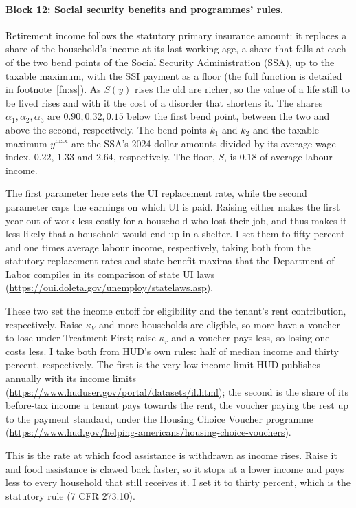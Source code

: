 \documentclass[10pt]{article}
\begin{document}
\paragraph{Block 12: Social security benefits and programmes' rules.}
\begin{description}\setlength{\itemsep}{0.25em}\setlength{\parskip}{0em}
\item[$S(y)$ and $\underline S$, social security and its floor.] Retirement income follows the statutory
primary insurance amount: it replaces a share of the household's income at its last working
age, a share that falls at each of the two bend points of the Social Security Administration (SSA), up to
the taxable maximum, with the SSI payment as a floor (the full function is detailed in footnote~\ref{fn:ss}). As $S(y)$ rises the old are richer, so the value of a life
still to be lived rises and with it the cost of a disorder that shortens it. The shares
$\alpha_1,\alpha_2,\alpha_3$ are $0.90, 0.32, 0.15$ below the first bend point, between the two and above the second, respectively. The
bend points $k_1$ and $k_2$ and the taxable maximum $y^{\max}$ are the SSA's 2024 dollar
amounts divided by its average wage index, $0.22$, $1.33$ and
$2.64$, respectively. The floor, $\underline S$, is $0.18$ of average
labour income.
\item[$\psi_{ui}$ and $\bar y$, UI.]   The first parameter here sets the UI replacement rate, while the second parameter caps the earnings on which UI is paid. Raising either makes the first year out of work less costly for a household who lost their job, and thus makes it less likely that a household would end up in a shelter. I set them to fifty percent and one
times average labour income, respectively, taking both from the statutory replacement rates
and state benefit maxima that the Department of Labor compiles in its comparison of
state UI laws
(\url{https://oui.doleta.gov/unemploy/statelaws.asp}).

\item[$\kappa_V$ and $\kappa_r$, the voucher rules.] These two set the income
cutoff for eligibility and the tenant's rent contribution, respectively. Raise $\kappa_V$ and more households are eligible, so more have a voucher to lose under Treatment First; raise $\kappa_r$ and a voucher pays less, so losing one costs less. I take both from HUD's own
rules: half of median income and thirty
percent, respectively. The first is the very low-income limit HUD publishes
annually with its income limits
(\url{https://www.huduser.gov/portal/datasets/il.html}); the second is the share of its before-tax income a tenant pays towards the rent, the voucher
paying the rest up to the payment standard, under the Housing Choice
Voucher programme
(\url{https://www.hud.gov/helping-americans/housing-choice-vouchers}).

\item[$\varrho$, the food stamp clawback rate.] This is the rate at which food assistance is withdrawn as income rises. Raise it and food assistance is clawed back faster, so it stops at a lower income and pays less to every household that still receives it. I set it to thirty percent, which is the statutory rule (7 CFR 273.10).
\end{description}
\end{document}
